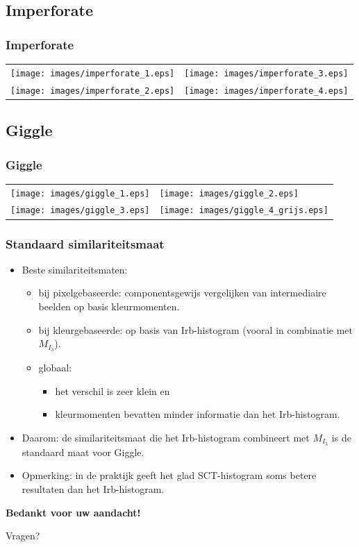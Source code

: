 \documentclass[dutch]{beamer}
\theoremstyle{definition}
\theoremstyle{remark}
\theoremstyle{example}
\begin{document}
\subsection{Imperforate}
\frame
{
  \frametitle{Imperforate}
  
  \centering
  \begin{tabular}{@{}rl@{}}
  \texttt{[image: images/imperforate\_1.eps]} &
  \texttt{[image: images/imperforate\_3.eps]} \vspace{8pt}\\
  \texttt{[image: images/imperforate\_2.eps]} &
  \texttt{[image: images/imperforate\_4.eps]}
  \end{tabular}
}
\subsection{Giggle}
\frame
{
  \frametitle{Giggle}
  
  \centering
  \begin{tabular}{@{}rl@{}}
  \texttt{[image: images/giggle\_1.eps]} &
  \texttt{[image: images/giggle\_2.eps]} \vspace{8pt}\\
  \texttt{[image: images/giggle\_3.eps]} &
  \texttt{[image: images/giggle\_4\_grijs.eps]}
  \end{tabular}
}
\frame
{
	\frametitle{Standaard similariteitsmaat}
	
	\begin{itemize}
	\item Beste similariteitsmaten:
	\begin{itemize}
      \item bij pixelgebaseerde: componentsgewijs vergelijken van intermediaire
      beelden op basis kleurmomenten.
      \item bij kleurgebaseerde: op basis van Irb-histogram (vooral in combinatie
      met $M_{I_3}$). 
      \item globaal:
      \begin{itemize}
        \item het verschil is zeer klein en
        \item kleurmomenten bevatten minder informatie dan het Irb-histogram.
      \end{itemize}
    \end{itemize}
    \item Daarom: de similariteitsmaat die het Irb-histogram combineert met $M_{I_3}$
    is de standaard maat voor Giggle.
    \item Opmerking: in de praktijk geeft het glad SCT-histogram soms betere resultaten dan
    het Irb-histogram.
    \end{itemize}
}


\plainframe
{
  \begin{center}
  \Huge \textbf{\color{white}Bedankt voor uw aandacht!}
  \end{center}
  \vspace{10pt}
  \begin{center}
  \LARGE Vragen?
  \end{center}
}
\end{document}
